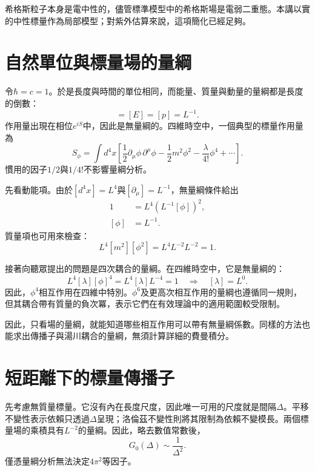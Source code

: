 希格斯粒子本身是電中性的，儘管標準模型中的希格斯場是電弱二重態。本講以實的中性標量作為局部模型；對紫外估算來說，這項簡化已經足夠。

\section{自然單位與標量場的量綱}

令\(\hbar=c=1\)。於是長度與時間的單位相同，而能量、質量與動量的量綱都是長度的倒數：
\begin{equation}
[m]=[E]=[p]=L^{-1}.
\end{equation}
作用量出現在相位\(e^{iS}\)中，因此是無量綱的。四維時空中，一個典型的標量作用量為
\begin{equation}
S_\phi=\int d^4x\left[
\frac12\partial_\mu\phi\,\partial^\mu\phi
-\frac12m^2\phi^2
-\frac{\lambda}{4!}\phi^4
+\cdots\right].
\end{equation}
慣用的因子\(1/2\)與\(1/4!\)不影響量綱分析。

先看動能項。由於\([d^4x]=L^4\)與\([\partial_\mu]=L^{-1}\)，無量綱條件給出
\begin{align}
1
&=L^4\left(L^{-1}[\phi]\right)^2,\\
[\phi]&=L^{-1}.
\end{align}
質量項也可用來檢查：
\begin{equation}
L^4[m^2][\phi^2]
=L^4L^{-2}L^{-2}=1.
\end{equation}

接著向聽眾提出的問題是四次耦合的量綱。在四維時空中，它是無量綱的：
\begin{equation}
L^4[\lambda][\phi]^4=L^4[\lambda]L^{-4}=1
\quad\Longrightarrow\quad [\lambda]=L^0.
\end{equation}
因此，\(\phi^4\)相互作用在四維中特別。\(\phi^6\)及更高次相互作用的量綱也遵循同一規則，但其耦合帶有質量的負次冪，表示它們在有效理論中的適用範圍較受限制。

因此，只看場的量綱，就能知道哪些相互作用可以帶有無量綱係數。同樣的方法也能求出傳播子與湯川耦合的量綱，無須計算詳細的費曼積分。

\section{短距離下的標量傳播子}

先考慮無質量標量。它沒有內在長度尺度，因此唯一可用的尺度就是間隔\(\Delta\)。平移不變性表示依賴只透過\(\Delta\)呈現；洛倫茲不變性則將其限制為依賴不變模長。兩個標量場的乘積具有\(L^{-2}\)的量綱。因此，略去數值常數後，
\begin{equation}
G_0(\Delta)\sim\frac{1}{\Delta^2}.
\end{equation}
僅憑量綱分析無法決定\(4\pi^2\)等因子。

